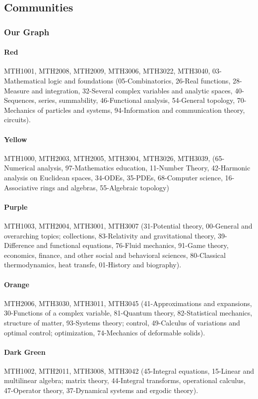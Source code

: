 \documentclass[english, 12pt]{article}
\begin{document}
\subsection{Communities}\label{app:communities_comp}
\subsubsection{Our Graph} \label{app:our_graph_communities}
\paragraph{Red} MTH1001, MTH2008, MTH2009, MTH3006, MTH3022, MTH3040,  03-Mathematical logic and foundations (05-Combinatorics, 26-Real functions, 28- Measure and integration, 32-Several complex variables and analytic spaces, 40-Sequences, series, summability, 46-Functional analysis, 54-General topology, 70-Mechanics of particles and systems, 94-Information and communication theory, circuits).
\parskip=-16.0pt
\paragraph{Yellow} MTH1000, MTH2003, MTH2005, MTH3004, MTH3026, MTH3039, (65-Numerical analysis, 97-Mathematics education, 11-Number Theory, 42-Harmonic analysis on Euclidean spaces, 34-ODEs, 35-PDEs, 68-Computer science, 16-Associative rings and algebras, 55-Algebraic topology)
\paragraph{Purple} MTH1003, MTH2004, MTH3001, MTH3007 (31-Potential theory, 00-General and overarching topics; collections, 83-Relativity and gravitational theory, 39-Difference and functional equations, 76-Fluid mechanics, 91-Game theory, economics, finance, and other social and behavioral sciences, 80-Classical thermodynamics, heat transfe, 01-History and biography).
\paragraph{Orange} MTH2006, MTH3030, MTH3011, MTH3045 (41-Approximations and expansions, 30-Functions of a complex variable, 81-Quantum theory, 82-Statistical mechanics, structure of matter, 93-Systems theory; control, 49-Calculus of variations and optimal control; optimization, 74-Mechanics of deformable solids).
\paragraph{Dark Green} MTH1002, MTH2011, MTH3008, MTH3042 (45-Integral equations, 15-Linear and multilinear algebra; matrix theory, 44-Integral transforms, operational calculus, 47-Operator theory, 37-Dynamical systems and ergodic theory).
\end{document}
